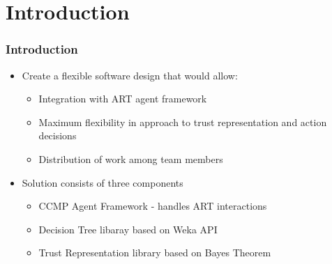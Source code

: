 \section{Introduction}
\begin{frame}
\frametitle{Introduction}
\begin{itemize}
  \item Create a flexible software design that would allow:
  \begin{itemize}
    \item Integration with ART agent framework
    \item Maximum flexibility in approach to trust representation and
    action decisions
    \item Distribution of work among team members
  \end{itemize}
  \item Solution consists of three components
  \begin{itemize}
    \item CCMP Agent Framework - handles ART interactions
    \item Decision Tree libaray based on Weka API
    \item Trust Representation library based on Bayes Theorem
  \end{itemize}
\end{itemize}

\end{frame}